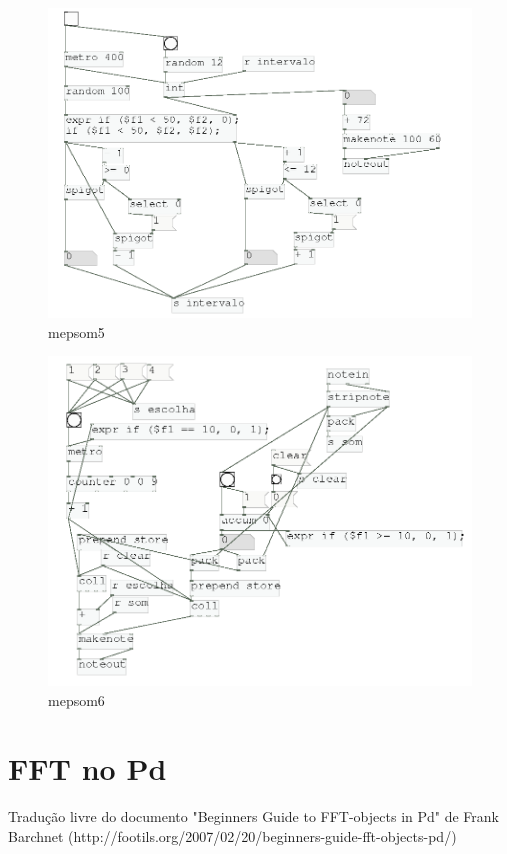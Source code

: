 \documentclass{ppgmus}
\begin{document}
\begin{figure}
\includegraphics[scale=.4]{mepsom5}
\caption{mepsom5}
\label{mepsom5}
\end{figure}

\begin{figure}
\includegraphics[scale=.4]{mepsom6}
\caption{mepsom6}
\label{mepsom6}
\end{figure}



\section{FFT no Pd}
\label{sec:fftpd}

Tradução livre do documento "Beginners Guide to FFT-objects in Pd" de Frank Barchnet 
(http://footils.org/2007/02/20/beginners-guide-fft-objects-pd/)
\end{document}

